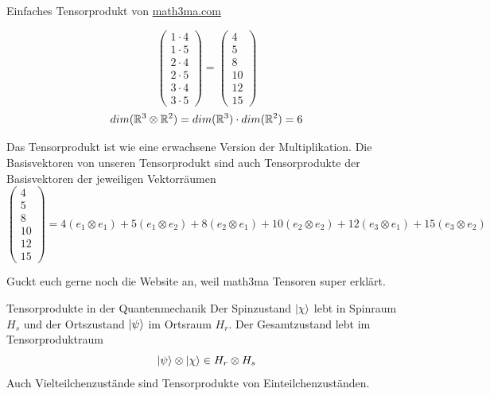 \begin{Beispiel}{Einfaches Tensorprodukt von \href{https://www.math3ma.com/blog/the-tensor-product-demystified}{math3ma.com}}
\begin{enumerate}
{$$\begin{pmatrix}
        1\cdot 4 \\
        1\cdot 5\\
        2\cdot 4\\
        2\cdot 5\\
        3\cdot 4\\
        3\cdot 5
    \end{pmatrix}=\begin{pmatrix}
        4 \\
        5\\
        8\\
        10\\
        12\\
        15
    \end{pmatrix}$$
    $$dim(\mathbb{R}^3\otimes \mathbb{R}^2)=dim(\mathbb{R}^3)\cdot dim(\mathbb{R}^2)=6$$}
    \end{enumerate}
    Das Tensorprodukt ist wie eine erwachsene Version der Multiplikation. Die Basisvektoren von unseren Tensorprodukt sind auch Tensorprodukte der Basisvektoren der jeweiligen Vektorräumen
    $$\begin{pmatrix}
        4 \\
        5\\
        8\\
        10\\
        12\\
        15
    \end{pmatrix}= 4(e_1\otimes e_1) + 5(e_1\otimes e_2)+8(e_2\otimes e_1) + 10(e_2\otimes e_2) + 12(e_3\otimes e_1) + 15(e_3\otimes e_2)$$
\end{Beispiel}
Guckt euch gerne noch die Website an, weil math3ma Tensoren super erklärt.
\begin{Beispiel}{Tensorprodukte in der Quantenmechanik}
    Der Spinzustand $\ket{\chi}$ lebt in Spinraum $H_s$ und der Ortszustand $\ket{\psi}$ im Ortsraum $H_r$. Der Gesamtzustand lebt im Tensorproduktraum
    $$\ket{\psi}\otimes\ket{\chi} \in H_r\otimes H_s$$
    Auch Vielteilchenzustände sind Tensorprodukte von Einteilchenzuständen.
\end{Beispiel}
